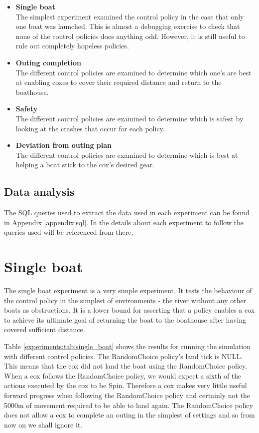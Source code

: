   \begin{itemize}
    \item{\textbf{Single boat}}\\
    The simplest experiment examined the control policy in the case
    that only one boat was launched. This is almost a debugging
    exercise to check that none of the control policies does anything
    odd. However, it is still useful to rule out completely hopeless policies.
  
    \item{\textbf{Outing completion}}\\
    The different control policies are examined to determine which
    one's are best at enabling coxes to cover their required distance
    and return to the boathouse.
    
    \item{\textbf{Safety}}\\
    The different control policies are examined to determine which is
    safest by looking at the crashes that occur for each policy.

    \item{\textbf{Deviation from outing plan}}\\
    The different control policies are examined to determine which is
    best at helping a boat stick to the cox's desired gear.
  \end{itemize}

  \subsection{Data analysis}
  The SQL queries used to extract the data used in each experiment can be found in Appendix \ref{appendix:sql}. In the details about each experiment to follow the queries used will be referenced from there.

\section{Single boat}
  The single boat experiment is a very simple experiment. It tests the behaviour of the control policy in the simplest of environments - the river without any other boats as obstructions. It is a lower bound for asserting that a policy enables a cox to achieve its ultimate goal of returning the boat to the boathouse after having covered sufficient distance.
  
  Table \ref{experiments:tab:single_boat} shows the results for running the simulation with different control policies. The RandomChoice policy's land tick is NULL. This means that the cox did not land the boat using the RandomChoice policy. When a cox follows the RandomChoice policy, we would expect a sixth of the actions executed by the cox to be Spin. Therefore a cox makes very little useful forward progress when following the RandomChoice policy and certainly not the 5000m of movement required to be able to land again. The RandomChoice policy does not allow a cox to complete an outing in the simplest of settings and so from now on we shall ignore it.
  
